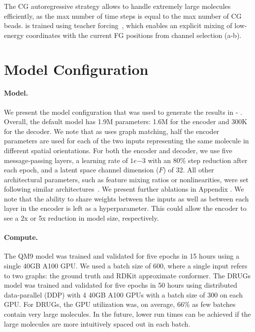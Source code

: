 The CG autoregressive strategy allows \model to handle extremely large molecules efficiently, as the max number of time steps is equal to the max number of CG beads. \model is trained using teacher forcing~\citep{teacher-forcing}, which enables an explicit mixing of low-energy coordinates with the current FG positions from channel selection (a-b).
\vspace{-2ex}

\section{Model Configuration}
\label{section:appendix-breakdown}
\vspace{-1ex}
\paragraph{Model.} We present the model configuration that was used to generate the results in  - .
Overall, the default model has 1.9M parameters: 1.6M for the encoder and 300K for the decoder. We note that as \model uses graph matching, half the encoder parameters are used for each of the two inputs representing the same molecule in different spatial orientations. For both the encoder and decoder, we use five message-passing layers, a learning rate of $1e{-3}$ with an 80\% step reduction after each epoch, and a latent space channel dimension ($F$) of 32. All other architectural parameters, such as feature mixing ratios or nonlinearities, were set following similar architectures~\citep{3dlinker, vn-mlp, equibind}. We present further ablations in Appendix . We note that the ability to share weights between the inputs as well as between each layer in the encoder is left as a hyperparameter. This could allow the encoder to see a 2x or 5x reduction in model size, respectively.

\paragraph{Compute.}
The QM9 model was trained and validated for five epochs in 15 hours using a single 40GB A100 GPU. We used a batch size of 600, where a single input refers to two graphs: the ground truth and RDKit approximate conformer. The DRUGs model was trained and validated for five epochs in 50 hours using distributed data-parallel (DDP) with 4 40GB A100 GPUs with a batch size of 300 on each GPU. For DRUGs, the GPU utilization was, on average, 66\% as few batches contain very large molecules. In the future, lower run times can be achieved if the large molecules are more intuitively spaced out in each batch. 

